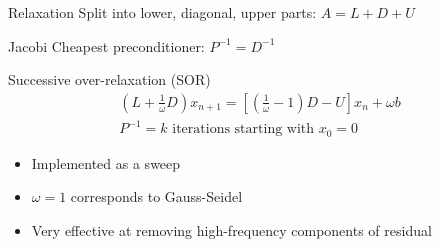 \begin{frame}{Relaxation}
  Split into lower, diagonal, upper parts: \alert{$ A = L + D + U $}
  
  \begin{block}{Jacobi}
    Cheapest preconditioner: $P^{-1} = D^{-1}$
  \end{block}
  
  \begin{block}{Successive over-relaxation (SOR)}
    \begin{gather*}
      \left(L + \frac 1 \omega D\right) x_{n+1} = \left[\left(\frac
          1\omega-1\right)D - U\right] x_n + \omega b \\
      P^{-1} = \text{$k$ iterations starting with $x_0=0$}
    \end{gather*}
    \begin{itemize}
    \item Implemented as a sweep
    \item $\omega = 1$ corresponds to Gauss-Seidel
    \item Very effective at removing high-frequency components of residual
    \end{itemize}
  \end{block}
\end{frame}



